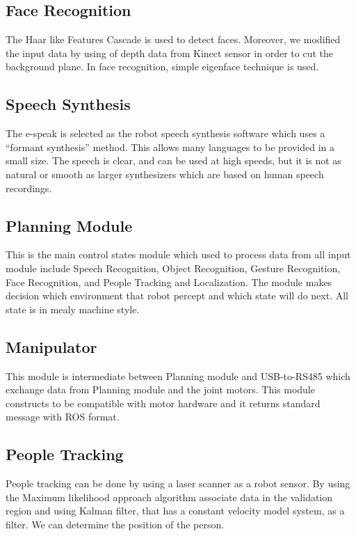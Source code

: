 \documentclass{llncs}
\newcommand{\dq}[1]{``#1''}
\begin{document}
\subsection{Face Recognition}

The Haar like Features Cascade is used to detect faces. Moreover, we modified the input data by using of depth data from Kinect sensor in order to cut the background plane. In face recognition, simple eigenface technique is used.

\subsection{Speech Synthesis}

The e-speak is selected as the robot speech synthesis software which uses a \dq{formant synthesis} method. This allows many languages to be provided in a small size. The speech is clear, and can be used at high speeds, but it is not as natural or smooth as larger synthesizers which are based on human speech recordings.

\subsection{Planning Module}

This is the main control states module which used to process data from all input module include Speech Recognition, Object Recognition, Gesture Recognition, Face Recognition, and People Tracking and Localization. The module makes decision which environment that robot percept and which state will do next. All state is in mealy machine style.

\subsection{Manipulator}

This module is intermediate between Planning module and USB-to-RS485 which exchange data from Planning module and the joint motors. This module constructs to be compatible with motor hardware and it returns standard message with ROS format.

\subsection{People Tracking}

People tracking can be done by using a laser scanner as a robot sensor. By using the Maximum likelihood approach algorithm associate data in the validation region and using Kalman filter, that has a constant velocity model system, as a filter. We can determine the position of the person.
\end{document}

